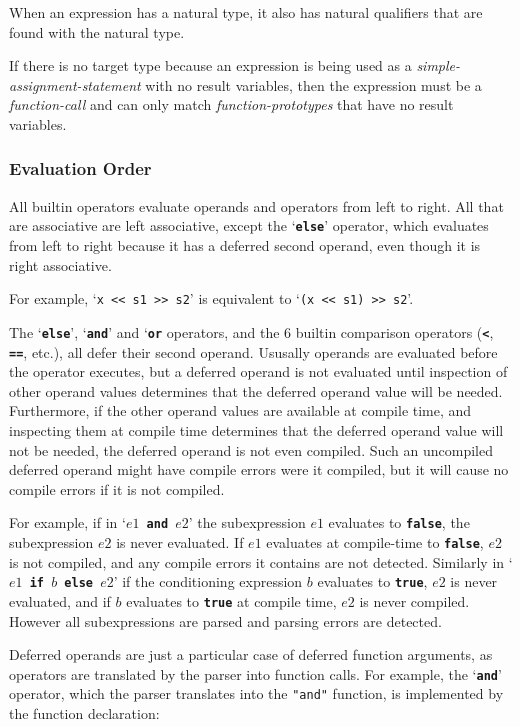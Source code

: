 \documentclass[12pt]{article}
\newcommand{\TT}[1]{{\tt \bfseries #1}}
\begin{document}
When an expression has a natural type, it also has natural qualifiers
that are found with the natural type.

If there is no target type because an expression is being used
as a {\em simple-assignment-statement} with no result variables, then
the expression must be a {\em function-call} and can only match
{\em function-prototypes} that have no result variables.

\subsubsection{Evaluation Order}
\label{EVALUATION-ORDER}

All builtin operators evaluate operands and operators from
left to right.  All that are associative are left associative,
except the `\TT{else}' operator, which evaluates from left
to right because it has a deferred second operand, even though
it is right associative.

For example, `{\tt x <{}< s1 >{}> s2}' is
equivalent to `{\tt (x <{}< s1) >{}> s2}'.

The `\TT{else}', `\TT{and}' and `\TT{or} operators, and the
6 builtin comparison operators (\TT{<}, \TT{==}, etc.), all
defer their second operand.  Ususally operands are evaluated
before the operator executes, but a deferred operand is not
evaluated until inspection of other operand values determines
that the deferred operand value will be needed.  Furthermore,
if the other operand values are available at compile time,
and inspecting them at compile time determines that the deferred
operand value will not be needed, the deferred operand is not
even compiled.  Such an uncompiled deferred operand might have
compile errors were it compiled, but it will cause no compile
errors if it is not compiled.

For example, if in `\TT{$e1$~and~$e2$}' the subexpression $e1$
evaluates to \TT{false}, the subexpression $e2$ is never evaluated.
If $e1$ evaluates at compile-time to \TT{false},
$e2$ is not compiled, and any compile errors it contains
are not detected.  Similarly in `\TT{$e1$~if~$b$~else~$e2$}' if the
conditioning expression $b$ evaluates to \TT{true}, $e2$ is
never evaluated, and if $b$ evaluates to \TT{true} at compile
time, $e2$ is never compiled.  However all subexpressions are parsed and
parsing errors are detected.

Deferred operands are just a particular case of deferred function arguments,
as operators are translated by the parser into function calls.
For example, the `\TT{and}' operator, which the parser translates
into the {\tt "and"} function, is implemented by the function
declaration:
\end{document}
